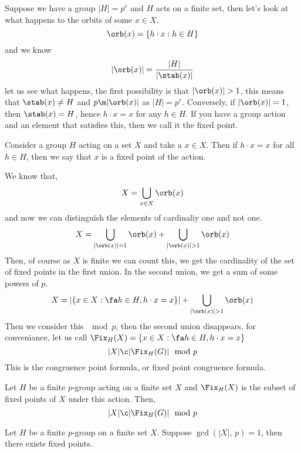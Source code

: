 Suppose we have a group $|H| = p^r$ and $H$ acts on a finite set, then let's look at what happens to the orbits of some $x \in X$.
$$ \orb (x) = \{h \cdot x : h \in H\} $$
and we know
$$ |\orb(x)| = \frac{|H|}{|\stab(x)|} $$
let us see what happens, the first possibility is that $|\orb(x)| > 1$, this means that $\stab(x) \ne H$ and $p \m |\orb(x)|$ as $|H| = p^r$. Conversely, if $|\orb(x)| = 1$, then $\stab(x) = H$, hence $h \cdot x = x$ for any $h \in H$. If you have a group action and an element that satisfies this, then we call it the fixed point.
\begin{ndefi}
  Consider a group $H$ acting on a set $X$ and take a $x \in X$. Then if $h \cdot x = x$ for all $h \in H$, then we say that $x$ is a fixed point of the action.
\end{ndefi}
We know that,
$$ X = \bigcup_{x \in X}{\orb(x)} $$
and now we can distinguish the elements of cardinaliy one and not one.
$$ X = \bigcup_{|\orb(x)| = 1}{\orb(x)} + \bigcup_{|\orb(x)| > 1}{\orb(x)} $$
Then, of course as $X$ is finite we can count this, we get the cardinality of the set of fixed points in the first union. In the second union, we get a sum of some powers of $p$.
$$ X = |\{x \in X : \fa h \in H, h \cdot x = x\}| + \bigcup_{|\orb(x)| > 1}{\orb(x)} $$
Then we consider this $\mod p$, then the second union disappears, for conveniance, let us call $\Fix_H(X) = \{x \in X : \fa h \in H, h \cdot x = x\}$
$$ |X| \c |\Fix_H(G)| \mod p $$
This is the congruence point formula, or fixed point congruence formula.
\begin{nthm}
  Let $H$ be a finite $p$-group acting on a finite set $X$ and $\Fix_H(X)$ is the subset of fixed points of $X$ under this action. Then,
  $$ |X| \c |\Fix_H(G)| \mod p $$
\end{nthm}
\begin{ncor}
  Let $H$ be a finite $p$-group on a finite set $X$. Suppose $\gcd(|X|,\,p) = 1$, then there exists fixed points.
\end{ncor}

